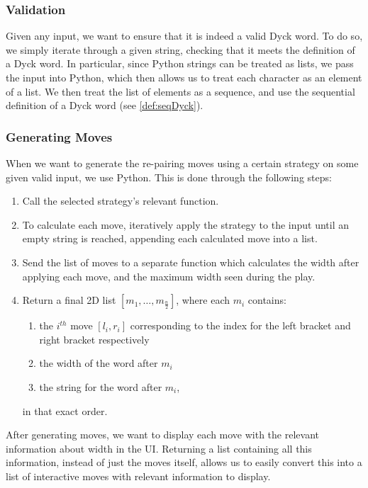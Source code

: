 \subsubsection{Validation}
Given any input, we want to ensure that it is indeed a valid Dyck word. To do so, we simply iterate through a given string, checking that it meets the definition of a Dyck word. In particular, since Python strings can be treated as lists, we pass the input into Python, which then allows us to treat each character as an element of a list. We then treat the list of elements as a sequence, and use the sequential definition of a Dyck word (see \autoref{def:seqDyck}). 

\subsubsection{Generating Moves}
When we want to generate the re-pairing moves using a certain strategy on some given valid input, we use Python. This is done through the following steps:
\begin{enumerate}
    \item Call the selected strategy's relevant function.
    \item To calculate each move, iteratively apply the strategy to the input until an empty string is reached, appending each calculated move into a list.
    \item Send the list of moves to a separate function which calculates the width after applying each move, and the maximum width seen during the play.
    \item Return a final 2D list $[m_{1}, \dots, m_{\frac{n}{2}}]$, where each $m_{i}$ contains: 
    \begin{enumerate}
        \item the $i^{th}$ move $[l_{i}, r_{i}]$ corresponding to the index for the left bracket and right bracket respectively
        \item the width of the word after $m_{i}$
        \item the string for the word after $m_{i}$,
    \end{enumerate}
    in that exact order.
\end{enumerate}
After generating moves, we want to display each move with the relevant information about width in the UI. Returning a list containing all this information, instead of just the moves itself, allows us to easily convert this into a list of interactive moves with relevant information to display.


